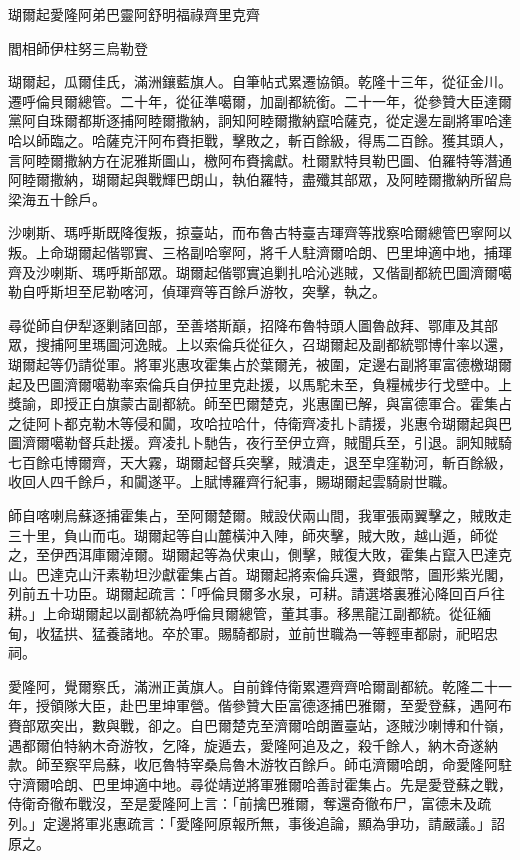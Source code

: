 
\begin{pinyinscope}
瑚爾起愛隆阿弟巴靈阿舒明福祿齊里克齊

閻相師伊柱努三烏勒登

瑚爾起，瓜爾佳氏，滿洲鑲藍旗人。自筆帖式累遷協領。乾隆十三年，從征金川。遷呼倫貝爾總管。二十年，從征準噶爾，加副都統銜。二十一年，從參贊大臣達爾黨阿自珠爾都斯逐捕阿睦爾撒納，詗知阿睦爾撒納竄哈薩克，從定邊左副將軍哈達哈以師臨之。哈薩克汗阿布賚拒戰，擊敗之，斬百餘級，得馬二百餘。獲其頭人，言阿睦爾撒納方在泥雅斯圖山，檄阿布賚擒獻。杜爾默特貝勒巴圖、伯羅特等潛通阿睦爾撒納，瑚爾起與戰輝巴朗山，執伯羅特，盡殲其部眾，及阿睦爾撒納所留烏梁海五十餘戶。

沙喇斯、瑪呼斯既降復叛，掠臺站，而布魯古特臺吉琿齊等戕察哈爾總管巴寧阿以叛。上命瑚爾起偕鄂實、三格副哈寧阿，將千人駐濟爾哈朗、巴里坤適中地，捕琿齊及沙喇斯、瑪呼斯部眾。瑚爾起偕鄂實追剿扎哈沁逃賊，又偕副都統巴圖濟爾噶勒自呼斯坦至尼勒喀河，偵琿齊等百餘戶游牧，突擊，執之。

尋從師自伊犁逐剿諸回部，至善塔斯巔，招降布魯特頭人圖魯啟拜、鄂庫及其部眾，搜捕阿里瑪圖河逸賊。上以索倫兵從征久，召瑚爾起及副都統鄂博什率以還，瑚爾起等仍請從軍。將軍兆惠攻霍集占於葉爾羌，被圍，定邊右副將軍富德檄瑚爾起及巴圖濟爾噶勒率索倫兵自伊拉里克赴援，以馬駝未至，負糧械步行戈壁中。上獎諭，即授正白旗蒙古副都統。師至巴爾楚克，兆惠圍已解，與富德軍合。霍集占之徒阿卜都克勒木等侵和闐，攻哈拉哈什，侍衛齊凌扎卜請援，兆惠令瑚爾起與巴圖濟爾噶勒督兵赴援。齊凌扎卜馳告，夜行至伊立齊，賊聞兵至，引退。詗知賊騎七百餘屯博爾齊，天大霧，瑚爾起督兵突擊，賊潰走，退至皁窪勒河，斬百餘級，收回人四千餘戶，和闐遂平。上賦博羅齊行紀事，賜瑚爾起雲騎尉世職。

師自喀喇烏蘇逐捕霍集占，至阿爾楚爾。賊設伏兩山間，我軍張兩翼擊之，賊敗走三十里，負山而屯。瑚爾起等自山麓橫沖入陣，師夾擊，賊大敗，越山遁，師從之，至伊西洱庫爾淖爾。瑚爾起等為伏東山，側擊，賊復大敗，霍集占竄入巴達克山。巴達克山汗素勒坦沙獻霍集占首。瑚爾起將索倫兵還，賚銀幣，圖形紫光閣，列前五十功臣。瑚爾起疏言：「呼倫貝爾多水泉，可耕。請選塔裏雅沁降回百戶往耕。」上命瑚爾起以副都統為呼倫貝爾總管，董其事。移黑龍江副都統。從征緬甸，收猛拱、猛養諸地。卒於軍。賜騎都尉，並前世職為一等輕車都尉，祀昭忠祠。

愛隆阿，覺爾察氏，滿洲正黃旗人。自前鋒侍衛累遷齊齊哈爾副都統。乾隆二十一年，授領隊大臣，赴巴里坤軍營。偕參贊大臣富德逐捕巴雅爾，至愛登蘇，遇阿布賚部眾突出，數與戰，卻之。自巴爾楚克至濟爾哈朗置臺站，逐賊沙喇博和什嶺，遇都爾伯特納木奇游牧，乞降，旋遁去，愛隆阿追及之，殺千餘人，納木奇遂納款。師至察罕烏蘇，收厄魯特宰桑烏魯木游牧百餘戶。師屯濟爾哈朗，命愛隆阿駐守濟爾哈朗、巴里坤適中地。尋從靖逆將軍雅爾哈善討霍集占。先是愛登蘇之戰，侍衛奇徹布戰沒，至是愛隆阿上言：「前擒巴雅爾，奪還奇徹布尸，富德未及疏列。」定邊將軍兆惠疏言：「愛隆阿原報所無，事後追論，顯為爭功，請嚴議。」詔原之。


\end{pinyinscope}
